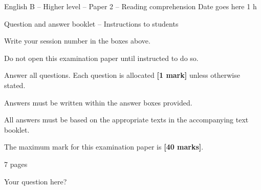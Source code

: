 \documentclass[11pt,a4paper]{article}
\begin{document}
\ibcover
  {English B -- Higher level -- Paper 2 -- Reading comprehension}
  {Date goes here}
  {1 h}
  {\begin{ibinstructions}{Question and answer booklet -- Instructions to students}
     \item Write your session number in the boxes above.
     \item Do not open this examination paper until instructed to do so.
     \item Answer all questions. Each question is allocated \textbf{[1 mark]}
           unless otherwise stated.
     \item Answers must be written within the answer boxes provided.
     \item All answers must be based on the appropriate texts in the
           accompanying text booklet.
     \item The maximum mark for this examination paper is \textbf{[40 marks]}.
   \end{ibinstructions}}
  {7 pages}
  {\ibsessioncode}


\ibrubricshort
{}


\ibrubricmcq
\begin{ibmcq}[C]{Your question here?}
\end{ibmcq}

\ibturnover        %
\clearpage


\end{document}
